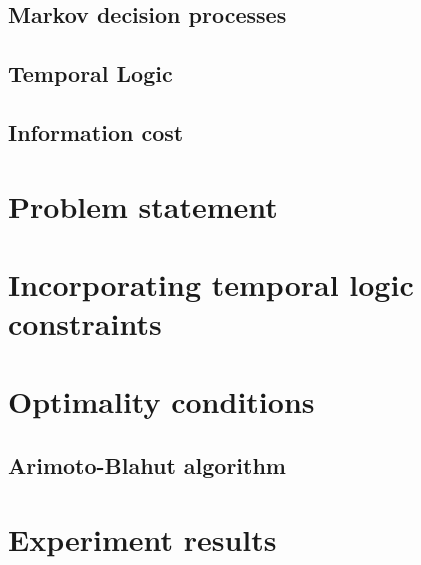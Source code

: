 \documentclass[letterpaper, 10 pt, conference]{ieeeconf}  %
\begin{document}
\subsection{Markov decision processes}
 

\subsection{Temporal Logic}


\subsection{Information cost}



\section{Problem statement}


\section{Incorporating temporal logic constraints}



\section{Optimality conditions}



\subsection{Arimoto-Blahut algorithm}


%


\section{Experiment results}\label{sec:exp}

\end{document}
